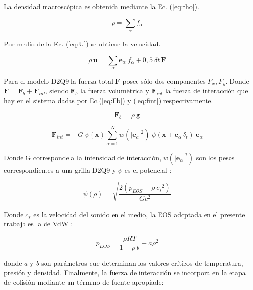 La densidad macroscópica es obtenida mediante la Ec. (\ref{eq:rho}).

\begin{equation}
        \rho = \sum_{\alpha} f_{\alpha}
        \label{eq:rho}
\end{equation}

Por medio de la Ec. (\ref{eq:U}) se obtiene la velocidad.

\begin{equation}
    \rho \> \mathbf{u} = \sum_{\alpha} {\mathbf{e}}_{\alpha} \> f_{\alpha} + 0,5 \> {\delta}{t} \> \mathbf{F}
    \label{eq:U}
\end{equation}

Para el modelo D2Q9 la fuerza total $\mathbf{F}$ posee sólo dos componentes $F_{x} , F_{y}$. Donde $ {\mathbf{F}} = {\mathbf{F}}_{b} + {\mathbf{F}}_{int} $, siendo ${\mathbf{F}}_{b}$ la fuerza volumétrica y ${\mathbf{F}}_{int}$ la fuerza de interacción que hay en el sistema dadas por Ec.(\ref{eq:Fb}) y (\ref{eq:fint}) respectivamente.

\begin{equation}
	{\mathbf{F}}_{b} = \rho \> \mathbf{g}
	\label{eq:Fb}
\end{equation}


\begin{equation}
{\mathbf{F}}_{int} = - G \> \psi(\mathbf{x}) \sum_{\alpha=1}^{N} w({|{\mathbf{e}}_{\alpha}|}^{2}) \> \psi (\mathbf{x} + {\mathbf{e}}_{\alpha} \> \delta_{t}) \> {\mathbf{e}}_{\alpha} 
\label{eq:fint}
\end{equation}

Donde G corresponde a la intensidad de interacción, $w({|{\mathbf{e}}_{\alpha}|}^{2})$ son los pesos correspondientes a una grilla D2Q9 y $\psi$ es el potencial :

\begin{equation} 
    \psi(\rho) = \sqrt{\frac{2 (p_{EOS} - \rho \> {c_{s}}^{2})}{G {c}^{2}}}
    \label{eq:psi}
\end{equation}

Donde $c_{s}$ es la velocidad del sonido en el medio, la EOS adoptada en el presente trabajo es la de VdW :

\begin{equation}
    p_{EOS} = \frac{\rho R T}{1- \rho \> b} - a {\rho}^{2}
    \label{eq:rho_eos}
\end{equation}

donde \textit{a} y \textit{b} son parámetros que determinan los valores críticos de temperatura, presión y densidad. Finalmente, la fuerza de interacción se incorpora en la etapa de colisión mediante un término de fuente apropiado:


